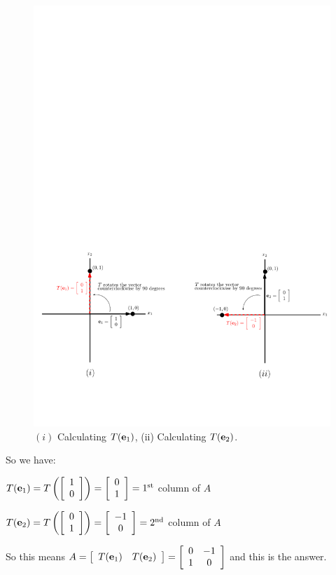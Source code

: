 \documentclass[12pt]{article}
\begin{document}
\begin{figure}[h!]
\begin{center} 
\includegraphics[width = 1 \textwidth]{l12comim2}
\caption{$(i)$ Calculating $T({\bf e}_1)$, (ii) Calculating $T({\bf e}_2)$.}
\end{center}
\end{figure} 

So we have:

$T({\bf e}_1) = T\left(  \left[ \begin{array}{c} 1 \\ 0  \end{array} \right]\right) = \left[ \begin{array}{c} 0 \\ 1  \end{array} \right] = 1^{\text{st}}$ column of $A$

$T({\bf e}_2) = T\left(  \left[ \begin{array}{c} 0 \\ 1  \end{array} \right]\right) = \left[ \begin{array}{c} -1 \\ 0  \end{array} \right] = 2^{\text{nd}}$ column of $A$

So this means $A = \left[ \begin{array}{cc} T({\bf e}_1) & T({\bf e}_2) \end{array} \right] = \left[ \begin{array}{cc} 0 & -1 \\ 1 & 0  \end{array} \right]$ and this is the answer. 



\end{document}
